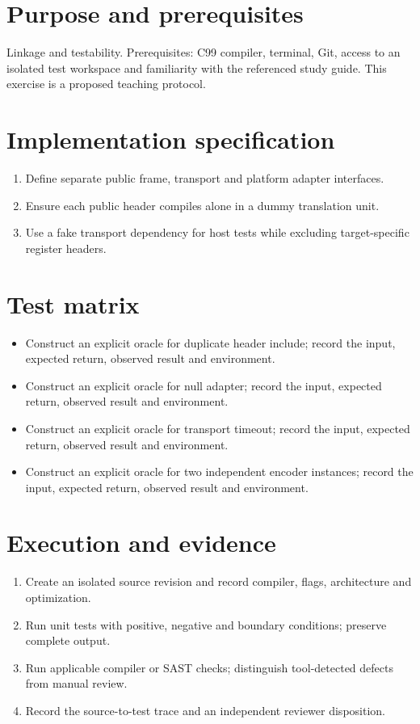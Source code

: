 \documentclass[10pt,letterpaper]{article}
\begin{document}
\makedoctitle
\makedocsummary
\section{Purpose and prerequisites}
Linkage and testability. Prerequisites: C99 compiler, terminal, Git, access to an isolated test workspace and familiarity with the referenced study guide. This exercise is a proposed teaching protocol.
\section{Implementation specification}
\begin{enumerate}
\item Define separate public frame, transport and platform adapter interfaces.
\item Ensure each public header compiles alone in a dummy translation unit.
\item Use a fake transport dependency for host tests while excluding target-specific register headers.
\end{enumerate}

\section{Test matrix}
\begin{itemize}
\item Construct an explicit oracle for duplicate header include; record the input, expected return, observed result and environment.
\item Construct an explicit oracle for null adapter; record the input, expected return, observed result and environment.
\item Construct an explicit oracle for transport timeout; record the input, expected return, observed result and environment.
\item Construct an explicit oracle for two independent encoder instances; record the input, expected return, observed result and environment.
\end{itemize}

\section{Execution and evidence}
\begin{enumerate}
\item Create an isolated source revision and record compiler, flags, architecture and optimization.
\item Run unit tests with positive, negative and boundary conditions; preserve complete output.
\item Run applicable compiler or SAST checks; distinguish tool-detected defects from manual review.
\item Record the source-to-test trace and an independent reviewer disposition.
\end{enumerate}
\end{document}
